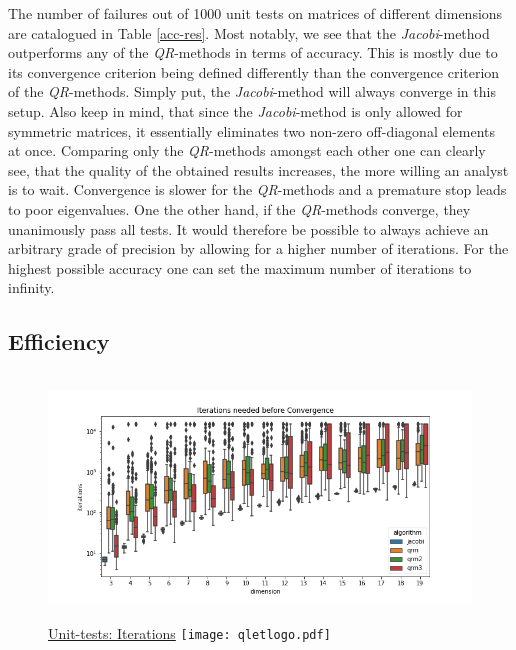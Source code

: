 \documentclass[12pt]{article}
\begin{document}
The number of failures out of 1000 unit tests on matrices of different dimensions are catalogued in Table \ref{acc-res}. Most notably, we see that the \textit{Jacobi}-method outperforms any of the \textit{QR}-methods in terms of accuracy. This is mostly due to its convergence criterion being defined differently than the convergence criterion of the \textit{QR}-methods. Simply put, the \textit{Jacobi}-method will always converge in this setup. Also keep in mind, that since the \textit{Jacobi}-method is only allowed for symmetric matrices, it essentially eliminates two non-zero off-diagonal elements at once. Comparing only the \textit{QR}-methods amongst each other one can clearly see, that the quality of the obtained results increases, the more willing an analyst is to wait. Convergence is slower for the \textit{QR}-methods and a premature stop leads to poor eigenvalues. One the other hand, if the \textit{QR}-methods converge, they unanimously pass all tests. It would therefore be possible to always achieve an arbitrary grade of precision by allowing for a higher number of iterations. For the highest possible accuracy one can set the maximum number of iterations to infinity.

\subsection{Efficiency}


\begin{figure}[b]
\centering
\caption{\href {https://github.com/thsis/NIS18/blob/master/tests/tests_eigen.py}{Unit-tests: Iterations}  \protect\texttt{[image: qletlogo.pdf]}}
  \label{algo_efficiency}
  \includegraphics[width=\textwidth, height=6.5cm]{../media/plots/iterations_boxplot.png}
\end{figure}
\end{document}
